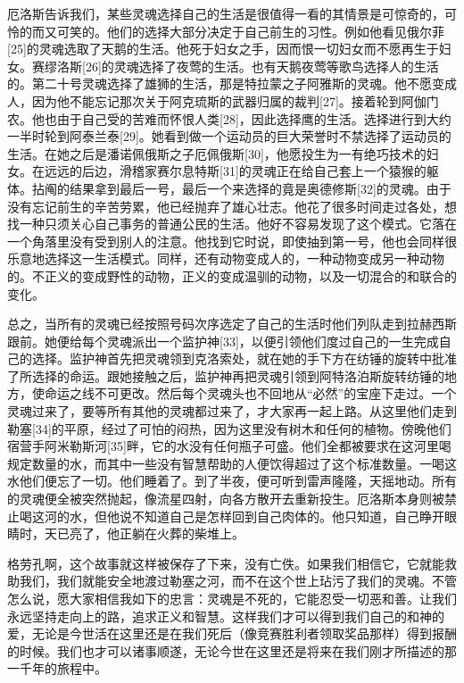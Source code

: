 \documentclass[12pt,oneside]{book}
\begin{document}
厄洛斯告诉我们，某些灵魂选择自己的生活是很值得一看的其情景是可惊奇的，可怜的而又可笑的。他们的选择大部分决定于自己前生的习性。例如他看见俄尔菲[25]的灵魂选取了天鹅的生活。他死于妇女之手，因而恨一切妇女而不愿再生于妇女。赛缪洛斯[26]的灵魂选择了夜莺的生活。也有天鹅夜莺等歌鸟选择人的生活的。第二十号灵魂选择了雄狮的生活，那是特拉蒙之子阿雅斯的灵魂。他不愿变成人，因为他不能忘记那次关于阿克琉斯的武器归属的裁判[27]。接着轮到阿伽门农。他也由于自己受的苦难而怀恨人类[28]，因此选择鹰的生活。选择进行到大约一半时轮到阿泰兰泰[29]。她看到做一个运动员的巨大荣誉时不禁选择了运动员的生活。在她之后是潘诺佩俄斯之子厄佩俄斯[30]，他愿投生为一有绝巧技术的妇女。在远远的后边，滑稽家赛尔息特斯[31]的灵魂正在给自己套上一个猿猴的躯体。拈阄的结果拿到最后一号，最后一个来选择的竟是奥德修斯[32]的灵魂。由于没有忘记前生的辛苦劳累，他已经抛弃了雄心壮志。他花了很多时间走过各处，想找一种只须关心自己事务的普通公民的生活。他好不容易发现了这个模式。它落在一个角落里没有受到别人的注意。他找到它时说，即使抽到第一号，他也会同样很乐意地选择这一生活模式。同样，还有动物变成人的，一种动物变成另一种动物的。不正义的变成野性的动物，正义的变成温驯的动物，以及一切混合的和联合的变化。

总之，当所有的灵魂已经按照号码次序选定了自己的生活时他们列队走到拉赫西斯跟前。她便给每个灵魂派出一个监护神[33]，以便引领他们度过自己的一生完成自己的选择。监护神首先把灵魂领到克洛索处，就在她的手下方在纺锤的旋转中批准了所选择的命运。跟她接触之后，监护神再把灵魂引领到阿特洛泊斯旋转纺锤的地方，使命运之线不可更改。然后每个灵魂头也不回地从“必然”的宝座下走过。一个灵魂过来了，要等所有其他的灵魂都过来了，才大家再一起上路。从这里他们走到勒塞[34]的平原，经过了可怕的闷热，因为这里没有树木和任何的植物。傍晚他们宿营手阿米勒斯河[35]畔，它的水没有任何瓶子可盛。他们全都被要求在这河里喝规定数量的水，而其中一些没有智慧帮助的人便饮得超过了这个标准数量。一喝这水他们便忘了一切。他们睡着了。到了半夜，便可听到雷声隆隆，天摇地动。所有的灵魂便全被突然抛起，像流星四射，向各方散开去重新投生。厄洛斯本身则被禁止喝这河的水，但他说不知道自己是怎样回到自己肉体的。他只知道，自己睁开眼睛时，天已亮了，他正躺在火葬的柴堆上。

格劳孔啊，这个故事就这样被保存了下来，没有亡佚。如果我们相信它，它就能救助我们，我们就能安全地渡过勒塞之河，而不在这个世上玷污了我们的灵魂。不管怎么说，愿大家相信我如下的忠言：灵魂是不死的，它能忍受一切恶和善。让我们永远坚持走向上的路，追求正义和智慧。这样我们才可以得到我们自己的和神的爱，无论是今世活在这里还是在我们死后（像竞赛胜利者领取奖品那样）得到报酬的时候。我们也才可以诸事顺遂，无论今世在这里还是将来在我们刚才所描述的那一千年的旅程中。
\end{document}
